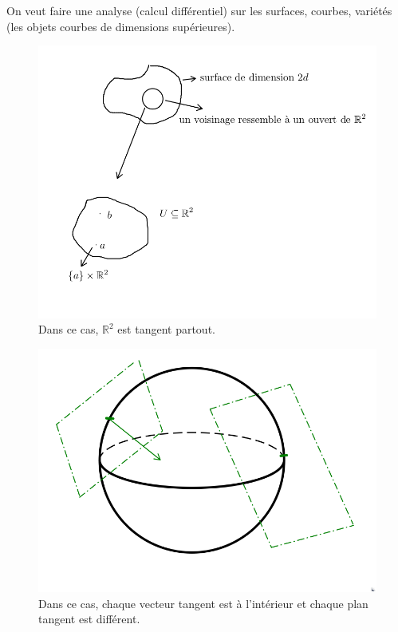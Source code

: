 \documentclass[french]{article}
\theoremstyle{definition}
\theoremstyle{remark}
\begin{document}
On veut faire une analyse (calcul différentiel) sur les surfaces, courbes, variétés (les objets courbes de dimensions supérieures).


\begin{figure}[h!]
  \centering
  \includegraphics[scale=0.3]{figures/motiv1.png}
  \caption{Dans ce cas, \(\mathbb{R}^2\) est tangent partout.}
  \label{}
\end{figure}

\begin{figure}[h!]
  \centering
  \includegraphics[scale=0.2]{figures/motiv2.png}
  \caption{Dans ce cas, chaque vecteur tangent est à l'intérieur et chaque plan tangent est différent.}
  \label{}
\end{figure}
\end{document}
